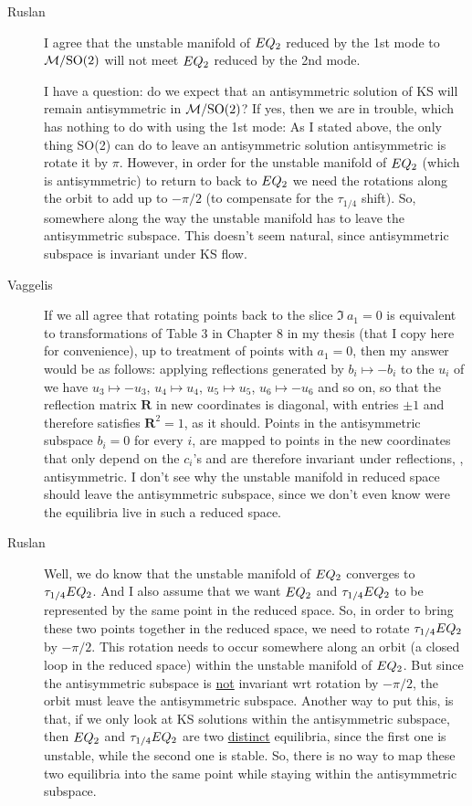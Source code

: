\begin{description}
\item[Ruslan]
 I agree that the unstable manifold of $EQ_{2}$ reduced by
 the 1st mode to ${\cal M}/\textrm{SO}(2)$ will not meet $EQ_{2}$ reduced by
 the 2nd mode. \par I have a question: do we expect that an
 antisymmetric solution of KS will remain antisymmetric in
 ${\cal M}/\textrm{SO}(2)$?  If yes, then we are in trouble, which has
 nothing to do with using the 1st mode: As I stated above,
 the only thing SO(2) can do to leave an antisymmetric
 solution antisymmetric is rotate it by $\pi$.  However, in
 order for the unstable manifold of $EQ_{2}$ (which is
 antisymmetric) to return to back to $EQ_{2}$ we need the
 rotations along the orbit to add up to $-\pi/2$ (to
 compensate for the $\tau_{1/4}$ shift).  So, somewhere along
 the way the unstable manifold has to leave the antisymmetric
 subspace.  This doesn't seem natural, since antisymmetric
 subspace is invariant under KS flow.

\item[Vaggelis]
If we all agree that rotating points back to the slice $\Im\
a_1=0$ is equivalent to transformations of Table 3 in Chapter
8 in my thesis (that I copy here for convenience), up to
treatment of points with $a_1=0$, then my answer would be as
follows: applying reflections generated by $b_i\mapsto - b_i$
to the $u_i$ of  we have $u_3\mapsto -u_3$,
$u_4\mapsto u_4$, $u_5\mapsto u_5$, $u_6\mapsto -u_6$ and so
on, so that the reflection matrix $\mathbf{R}$ in new
coordinates is diagonal, with entries $\pm 1$ and therefore
satisfies $\mathbf{R}^2=1$, as it should. Points in the
antisymmetric subspace $b_i=0$ for every $i$, are mapped to
points in the new coordinates that only depend on the $c_i$'s
and are therefore invariant under reflections, \ie,
antisymmetric. I don't see why the unstable manifold in
reduced space should leave the antisymmetric subspace, since
we don't even know were the equilibria live in such a reduced
space.

\item[Ruslan]
Well, we do know that the unstable manifold of $EQ_{2}$
converges to $\tau_{1/4}EQ_{2}$.  And I also assume that we
want $EQ_{2}$ and $\tau_{1/4}EQ_{2}$ to be represented by
the same point in the reduced space.  So, in order to bring
these two points together in the reduced space, we need to
rotate $\tau_{1/4}EQ_{2}$ by $-\pi/2$.  This rotation needs
to occur somewhere along an orbit (a closed loop in the
reduced space) within the unstable manifold of $EQ_{2}$.
But since the antisymmetric subspace is \underline{not}
invariant wrt rotation by $-\pi/2$, the orbit must leave the
antisymmetric subspace.  Another way to put this, is that, if
we only look at KS solutions within the antisymmetric
subspace, then $EQ_{2}$ and $\tau_{1/4}EQ_{2}$ are two
\underline{distinct} equilibria, since the first one is
unstable, while the second one is stable.  So, there is no
way to map these two equilibria into the same point while
staying within the antisymmetric subspace.


\end{description}
